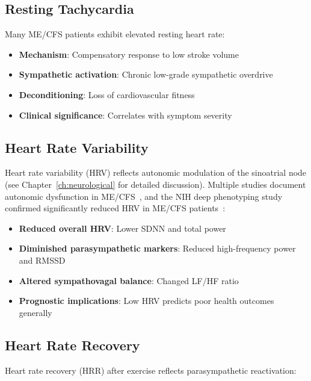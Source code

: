 \subsection{Resting Tachycardia}
\label{sec:resting-tachycardia}

Many ME/CFS patients exhibit elevated resting heart rate:

\begin{itemize}
    \item \textbf{Mechanism}: Compensatory response to low stroke volume
    \item \textbf{Sympathetic activation}: Chronic low-grade sympathetic overdrive
    \item \textbf{Deconditioning}: Loss of cardiovascular fitness
    \item \textbf{Clinical significance}: Correlates with symptom severity
\end{itemize}

\subsection{Heart Rate Variability}
\label{sec:hrv}

Heart rate variability (HRV) reflects autonomic modulation of the sinoatrial node (see Chapter~\ref{ch:neurological} for detailed discussion). Multiple studies document autonomic dysfunction in ME/CFS~\cite{Newton2007autonomicDysfunction}, and the NIH deep phenotyping study confirmed significantly reduced HRV in ME/CFS patients~\cite{walitt2024deep}:

\begin{itemize}
    \item \textbf{Reduced overall HRV}: Lower SDNN and total power
    \item \textbf{Diminished parasympathetic markers}: Reduced high-frequency power and RMSSD
    \item \textbf{Altered sympathovagal balance}: Changed LF/HF ratio
    \item \textbf{Prognostic implications}: Low HRV predicts poor health outcomes generally
\end{itemize}

\subsection{Heart Rate Recovery}
\label{sec:hr-recovery}

Heart rate recovery (HRR) after exercise reflects parasympathetic reactivation:

